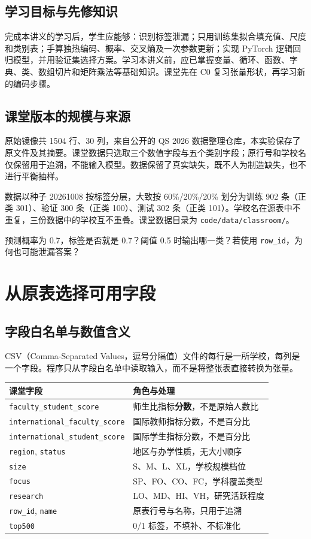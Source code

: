 \documentclass[UTF8,a4paper,11pt,fontset=fandol]{ctexart}
\newcommand{\file}[1]{\nolinkurl{#1}}
\begin{document}
\subsection{学习目标与先修知识}
完成本讲义的学习后，学生应能够：识别标签泄漏；只用训练集拟合填充值、尺度和类别表；手算独热编码、概率、交叉熵及一次参数更新；实现 PyTorch 逻辑回归模型，并用验证集选择方案。学习本讲义前，应已掌握变量、循环、函数、字典、类、数组切片和矩阵乘法等基础知识。课堂先在 C0 复习张量形状，再学习新的编码步骤。
\subsection{课堂版本的规模与来源}
原始镜像共 1504 行、30 列，来自公开的 QS 2026 数据整理仓库，本实验保存了原文件及其摘要。课堂数据只选取三个数值字段与五个类别字段；原行号和学校名仅保留用于追溯，不能输入模型。数据保留了真实缺失，既不人为制造缺失，也不进行平衡抽样。

数据以种子 20261008 按标签分层，大致按 60\%/20\%/20\% 划分为训练 902 条（正类 301）、验证 300 条（正类 100）、测试 302 条（正类 101）。学校名在源表中不重复，三份数据中的学校互不重叠。课堂数据目录为 \file{code/data/classroom/}。
\begin{questionbox}[C0：先说清任务]
预测概率为 0.7，标签是否就是 0.7？阈值 0.5 时输出哪一类？若使用 \texttt{row\_id}，为何也可能泄漏答案？
\end{questionbox}
\clearpage
\section{从原表选择可用字段}
\subsection{字段白名单与数值含义}
CSV（Comma-Separated Values，逗号分隔值）文件的每行是一所学校，每列是一个字段。程序只从字段白名单中读取输入，而不是将整张表直接转换为张量。
\par\noindent\begin{tabularx}{\linewidth}{L{7.0cm}Y}\toprule
课堂字段 & 角色与处理\\\midrule
\file{faculty_student_score} & 师生比指标\textbf{分数}，不是原始人数比\\
\file{international_faculty_score} & 国际教师指标分数，不是百分比\\
\file{international_student_score} & 国际学生指标分数，不是百分比\\
\file{region}, \file{status} & 地区与办学性质，无大小顺序\\
\file{size} & S、M、L、XL，学校规模档位\\
\file{focus} & SP、FO、CO、FC，学科覆盖类型\\
\file{research} & LO、MD、HI、VH，研究活跃程度\\
\file{row_id}, \file{name} & 原表行号与名称，只用于追溯\\
\file{top500} & 0/1 标签，不填补、不标准化\\\bottomrule
\end{tabularx}
\end{document}
